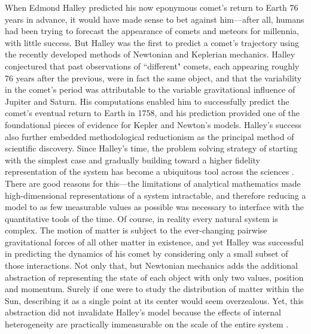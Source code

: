 \documentclass[]{article}
\begin{document}
When Edmond Halley predicted his now eponymous comet's return to Earth 76 years in advance, it would have made sense to bet against him---after all, humans had been trying to forecast the appearance of comets and meteors for millennia, with little success. But Halley was the first to predict a comet's trajectory using the recently developed methods of Newtonian and Keplerian mechanics.
Halley conjectured that past observations of ``different" comets, each appearing roughly 76 years after the previous, were in fact the same object, and that the variability in the comet's period was attributable to the variable gravitational influence of Jupiter and Saturn.
His computations enabled him to successfully predict the comet's eventual return to Earth in 1758, and his prediction provided one of the foundational pieces of evidence for Kepler and Newton's models. Halley's success also further embedded methodological reductionism as the principal method of scientific discovery.
Since Halley's time, the problem solving strategy of starting with the simplest case and gradually building toward a higher fidelity representation of the system has become a ubiquitous tool across the sciences \cite{polya_how_2009}.
There are good reasons for this---the limitations of analytical mathematics made high-dimensional representations of a system intractable, and therefore reducing a model to as few measurable values as possible was necessary to interface with the quantitative tools of the time. Of course, in reality every natural system is complex.
The motion of matter is subject to the ever-changing pairwise gravitational forces of all other matter in existence, and yet Halley was successful in predicting the dynamics of his comet by considering only a small subset of those interactions.
Not only that, but Newtonian mechanics adds the additional abstraction of representing the state of each object with only two values, position and momentum. Surely if one were to study the distribution of matter within the Sun, describing it as a single point at its center would seem overzealous. Yet, this abstraction did not invalidate Halley's model because the effects of internal heterogeneity are practically immeasurable on the scale of the entire system \cite{levins_dialectical_1987}.
\end{document}
